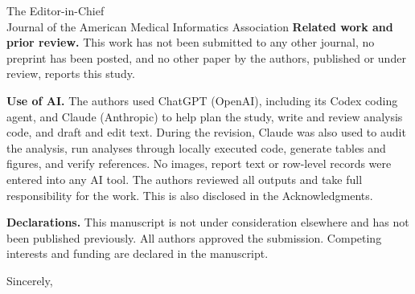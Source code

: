 \documentclass[11pt,a4paper]{letter}
\begin{document}
\begin{letter}{The Editor-in-Chief\\ Journal of the American Medical Informatics Association}
\textbf{Related work and prior review.} This work has not been submitted to
any other journal, no preprint has been posted, and no other paper by the
authors, published or under review, reports this study.

\textbf{Use of AI.} The authors used ChatGPT (OpenAI), including its Codex
coding agent, and Claude (Anthropic) to help plan the study, write and review analysis code, and draft
and edit text. During the revision, Claude was also used to audit the analysis,
run analyses through locally executed code, generate tables and figures, and
verify references. No images, report text or row-level records were entered
into any AI tool. The authors reviewed all outputs and take full responsibility
for the work. This is also disclosed in the Acknowledgments.

\textbf{Declarations.} This manuscript is not under consideration elsewhere and
has not been published previously. All authors approved the submission.
Competing interests and funding are declared in the manuscript.

\closing{Sincerely,}
\end{letter}
\end{document}
